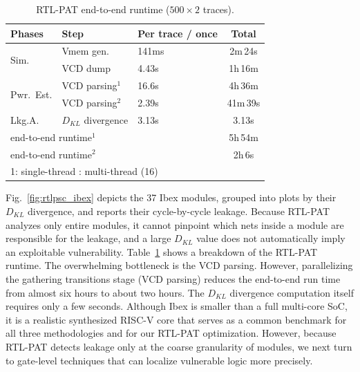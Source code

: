 \documentclass[sigconf]{acmart}
\begin{document}
\begin{table}[!b]
\centering
\caption{RTL-PAT end-to-end runtime ($500\times2$ traces).}
\label{tab:pscrtl_timing}

\begin{tabular}{l| l p{} c}
\hline
\textbf{Phases} & \textbf{Step} & 
\textbf{Per trace / once} & \textbf{Total} \\ \hline

\multirow{2}{*}{Sim.} & Vmem gen. & 141ms & 2m\,24s \\
& VCD dump & 4.43s & 1h\,16m \\ \hline

\multirow{2}{*}{Pwr.\ Est.} 
& VCD parsing$^{\mathrm{1}}$ & 16.6s & 4h\,36m \\
{} 
& VCD parsing$^{\mathrm{2}}$ & 2.39s & 41m\,39s \\ \hline

Lkg.A. 
& $D_{KL}$ divergence & 3.13s & 3.13s \\ \hline

\multicolumn{2}{l}{end-to-end runtime$^{\mathrm{1}}$} & & 5h\,54m \\
\multicolumn{2}{l}{end-to-end runtime$^{\mathrm{2}}$} & & 2h\,6s \\ \hline

\multicolumn{4}{l}{1: single-thread \quad 2: multi-thread (16)}
\end{tabular}%
\end{table}



Fig.~\ref{fig:rtlpsc_ibex} depicts the 37 Ibex modules, grouped into plots by their $D_{KL}$ divergence, and reports their cycle-by-cycle leakage.  Because RTL-PAT analyzes only entire modules, it cannot pinpoint which nets inside a module are responsible for the leakage, and a large $D_{KL}$ value does not automatically imply an exploitable vulnerability.
Table~\ref{tab:pscrtl_timing} shows a breakdown of the RTL-PAT runtime. The overwhelming bottleneck is the VCD parsing. However, parallelizing the gathering transitions stage (VCD parsing) reduces the end-to-end run time from almost six hours to about two hours. The $D_{KL}$ divergence computation itself requires only a few seconds. Although Ibex is smaller than a full multi-core SoC, it is a realistic synthesized RISC-V core that serves as a common benchmark for all three methodologies and for our RTL-PAT optimization. However, because RTL-PAT detects leakage only at the coarse granularity of modules, we next turn to gate-level techniques that can localize vulnerable logic more precisely.
\end{document}

